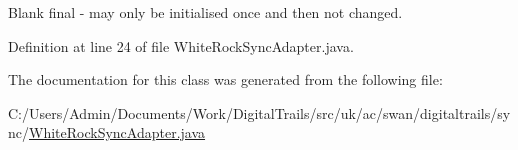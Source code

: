 Blank final -\/ may only be initialised once and then not changed. 



Definition at line 24 of file White\+Rock\+Sync\+Adapter.\+java.



The documentation for this class was generated from the following file\+:\begin{DoxyCompactItemize}
\item 
C\+:/\+Users/\+Admin/\+Documents/\+Work/\+Digital\+Trails/src/uk/ac/swan/digitaltrails/sync/\hyperlink{_white_rock_sync_adapter_8java}{White\+Rock\+Sync\+Adapter.\+java}\end{DoxyCompactItemize}
